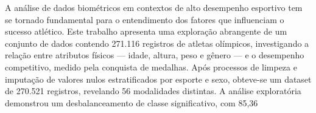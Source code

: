 \documentclass{article}
\begin{document}
\begin{resumo}
A análise de dados biométricos em contextos de alto desempenho esportivo tem se tornado fundamental para o entendimento dos fatores que influenciam o sucesso atlético. Este trabalho apresenta uma exploração abrangente de um conjunto de dados contendo 271.116 registros de atletas olímpicos, investigando a relação entre atributos físicos — idade, altura, peso e gênero — e o desempenho competitivo, medido pela conquista de medalhas. Após processos de limpeza e imputação de valores nulos estratificados por esporte e sexo, obteve-se um dataset de 270.521 registros, revelando 56 modalidades distintas. A análise exploratória demonstrou um desbalanceamento de classe significativo, com 85,36%
\end{resumo}

\begin{abstract}
Sports biometric data analysis in high-performance contexts has become fundamental to understanding the factors influencing athletic success. This work presents a comprehensive exploration of a dataset containing 271,116 records of Olympic athletes, investigating the relationship between physical attributes — age, height, weight, and gender — and competitive performance, measured by medal achievement. After cleaning and imputation processes stratified by sport and sex, a dataset of 270,521 records was obtained, revealing 56 distinct modalities. Exploratory analysis showed a significant class imbalance, with 85.36%
\end{abstract}
\end{document}

